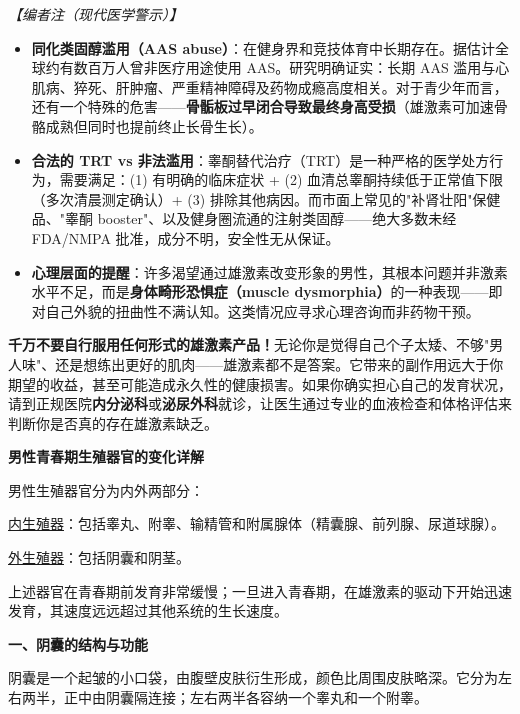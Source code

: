 \vspace{0.5em}
\noindent\textit{【编者注（现代医学警示）】}
\begin{itemize}
	\item \textbf{同化类固醇滥用（AAS abuse）}：在健身界和竞技体育中长期存在。据估计全球约有数百万人曾非医疗用途使用 AAS。研究明确证实：长期 AAS 滥用与心肌病、猝死、肝肿瘤、严重精神障碍及药物成瘾高度相关。对于青少年而言，还有一个特殊的危害——\textbf{骨骺板过早闭合导致最终身高受损}（雄激素可加速骨骼成熟但同时也提前终止长骨生长）。
	\item \textbf{合法的 TRT vs 非法滥用}：睾酮替代治疗（TRT）是一种严格的医学处方行为，需要满足：(1) 有明确的临床症状 + (2) 血清总睾酮持续低于正常值下限（多次清晨测定确认）+ (3) 排除其他病因。而市面上常见的"补肾壮阳"保健品、"睾酮 booster"、以及健身圈流通的注射类固醇——绝大多数未经 FDA/NMPA 批准，成分不明，安全性无从保证。
	\item \textbf{心理层面的提醒}：许多渴望通过雄激素改变形象的男性，其根本问题并非激素水平不足，而是\textbf{身体畸形恐惧症（muscle dysmorphia）}的一种表现——即对自己外貌的扭曲性不满认知。这类情况应寻求心理咨询而非药物干预。
\end{itemize}

\begin{tcolorbox}[colback=pink!5!white,colframe=red!50!black,title=贴心小叮咛]
\textbf{千万不要自行服用任何形式的雄激素产品！}无论你是觉得自己个子太矮、不够"男人味"、还是想练出更好的肌肉——雄激素都不是答案。它带来的副作用远大于你期望的收益，甚至可能造成永久性的健康损害。如果你确实担心自己的发育状况，请到正规医院\textbf{内分泌科}或\textbf{泌尿外科}就诊，让医生通过专业的血液检查和体格评估来判断你是否真的存在雄激素缺乏。
\end{tcolorbox}

\vspace{0.8em}
\noindent\textbf{男性青春期生殖器官的变化详解}

男性生殖器官分为内外两部分：

\underline{内生殖器}：包括睾丸、附睾、输精管和附属腺体（精囊腺、前列腺、尿道球腺）。

\underline{外生殖器}：包括阴囊和阴茎。

上述器官在青春期前发育非常缓慢；一旦进入青春期，在雄激素的驱动下开始迅速发育，其速度远远超过其他系统的生长速度。

\vspace{0.3em}
\noindent\textbf{一、阴囊的结构与功能}

阴囊是一个起皱的小口袋，由腹壁皮肤衍生形成，颜色比周围皮肤略深。它分为左右两半，正中由阴囊隔连接；左右两半各容纳一个睾丸和一个附睾。

